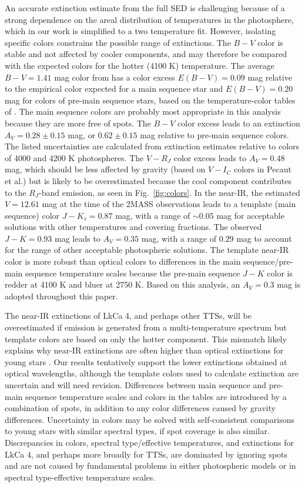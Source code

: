 \documentclass[12pt]{report}
\begin{document}
An accurate extinction estimate from the full SED is challenging because of a strong dependence on the areal distribution of temperatures in the photosphere, which in our work is simplified to a two temperature fit.  However, isolating specific colors constrains the possible range of extinctions.  
The $B-V$ color is stable and not affected by cooler components, and may therefore be compared with the expected colors for the hotter (4100 K) temperature.  
The average $B-V=1.41$ mag color from \citet{grankin08} has a color excess $E(B-V)=0.09$ mag relative to the empirical color expected for a main sequence star and $E(B-V)=0.20$ mag for colors of pre-main sequence stars, based on the temperature-color tables of \citep{pecaut13}.  The main sequence colors are probably most 
appropriate in this analysis because they are more free of spots.  
The $B-V$ color 
excess leads to an extinction $A_V=0.28\pm0.15$ mag, or $0.62\pm0.15$ mag relative to 
pre-main sequence colors.   The listed uncertainties are calculated from extinction estimates relative to colors of 4000 and 4200 K photospheres.
The $V-R_J$ color excess leads to $A_V=0.48$ mag, which should be less affected by gravity (based on $V-I_C$ colors in Pecaut et al.) but is likely to be overestimated because the cool component contributes to the $R_J$-band emission, as seen in Fig.~\ref{fig:colors}.
In the near-IR, the estimated $V=12.61$ mag at the time of the 2MASS observations leads to a template (main sequence) color 
$J-K_s=0.87$ mag, with a range of $\sim 0.05$ mag for acceptable solutions with other 
temperatures and covering fractions. The observed $J-K=0.93$ mag leads to $A_V=0.35$ mag, 
with a range of $0.29$ mag to account for the range of other acceptable photospheric solutions.  
The template near-IR color is more robust than optical colors to differences 
in the main sequence/pre-main sequence temperature scales because the pre-main 
sequence $J-K$ color is redder at 4100 K and bluer at 2750 K.  Based on this 
analysis, an $A_V=0.3$ mag is adopted throughout this paper. 

The near-IR extinctions of LkCa 4, and perhaps other TTSs, will be overestimated if emission is generated from a multi-temperature spectrum but template colors are based on only the hotter component.  This mismatch likely explains why near-IR extinctions are often higher than optical extinctions for young stars \citep[see analysis in][]{herczeg14}.  Our results tentatively support the lower extinctions obtained at optical wavelengths, although the template colors used to calculate extinction are uncertain and will need revision.  Differences between main sequence and pre-main sequence temperature scales and colors in the \citet{pecaut13} tables are introduced by a combination of spots, in addition to any color differences caused by gravity differences.
Uncertainty in colors may be solved with self-consistent comparisons to young stars with similar spectral types, if spot coverage is also similar.  Discrepancies in colors, spectral type/effective temperatures, and extinctions for LkCa 4, and perhaps more broadly for TTSs, are dominated by ignoring spots and are not caused by fundamental problems in either photospheric models or in spectral type-effective temperature scales.
\end{document}
